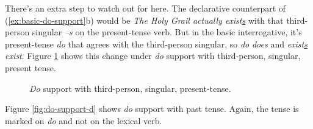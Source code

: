 There's an extra step to watch out for here. The declarative counterpart of (\ref{ex:basic-do-support}b) would be \textit{The Holy Grail actually exist\uline{s}} with that third-person singular \textit{--s} on the present-tense verb. But in the basic interrogative, it's present-tense \textit{do} that agrees with the third-person singular, so \textit{do} \rightarrow \textit{does} and \textit{exist\uline{s}} \rightarrow \textit{exist}. Figure \ref{fig:do-support-s} shows this change under \textit{do} support with third-person, singular, present tense.

\begin{figure}
    \centering
    \caption{\textit{Do} support with third-person, singular, present-tense.}
    \label{fig:do-support-s}
\end{figure}

\noindent Figure \ref{fig:do-support-d} shows \textit{do} support with past tense. Again, the tense is marked on \textit{do} and not on the lexical verb.

